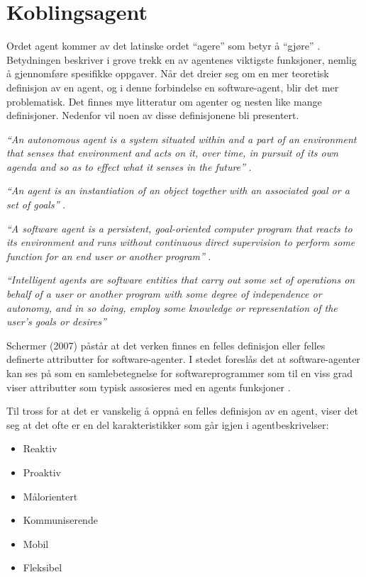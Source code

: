 \section{Koblingsagent}
Ordet agent kommer av det latinske ordet ``agere'' som betyr å ``gjøre'' \citep{website:agent}. Betydningen beskriver i grove trekk en av agentenes viktigste funksjoner, nemlig å gjennomføre spesifikke oppgaver. Når det dreier seg om en mer teoretisk definisjon av en agent, og i denne forbindelse en software-agent, blir det mer problematisk. Det finnes mye litteratur om agenter og nesten like mange definisjoner. Nedenfor vil noen av disse definisjonene bli presentert.

\textit{``An autonomous agent is a system situated within and a part of an environment
that senses that environment and acts on it, over time, in pursuit of its own agenda
and so as to effect what it senses in the future''} \citep{agent}.

\textit{``An agent is an instantiation of an object together with an associated goal or a set of goals''} \citep{luck_dinverno_agent}.

\textit{``A software agent is a persistent, goal-oriented computer program that reacts to its environment and runs without continuous direct supervision to perform some function for an end user or another program''} \citep{website:gibilesco_agent}.

\textit{``Intelligent agents are software entities that carry out some set of operations on behalf of a user or another program with some degree of independence or autonomy, and in so doing,
employ some knowledge or representation of the user's goals or desires''} \citep{agent}

Schermer (2007) påstår at det verken finnes en felles definisjon eller felles definerte attributter for software-agenter. I stedet foreslås det at software-agenter kan ses på som en samlebetegnelse for softwareprogrammer som til en viss grad viser attributter som typisk assosieres med en agents funksjoner \citep{schermer}.

Til tross for at det er vanskelig å oppnå en felles definisjon av en agent, viser det seg at det ofte er en del karakteristikker som går igjen i agentbeskrivelser:
\begin{itemize}
\item Reaktiv
\item Proaktiv
\item Målorientert
\item Kommuniserende
\item Mobil
\item Fleksibel
\end{itemize}

